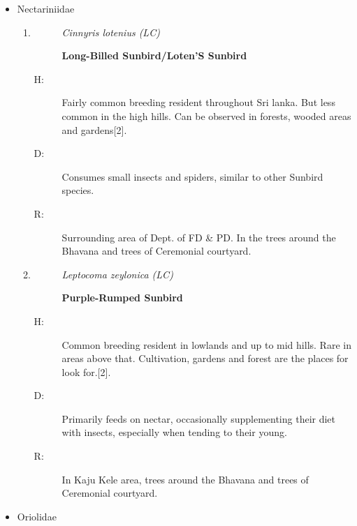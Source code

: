 \begin{itemize}
\begin{enumerate}
\begin{description}
\item[D: ]%
Primary diet comprises insects and other invertebrates. Occasion, they may also consume flower nectar, geckos, leeches and centipedes.%
\item[R: ]%
Around the Faculty of IT, Kaju kele and boat yard.%
\end{description}%
\end{enumerate}%
\item%
Nectariniidae%
\begin{enumerate}%
\item%
\begin{description}%
\item[]%
\textit{Cinnyris lotenius (LC)}%
\item[]%
\textbf{Long{-}Billed Sunbird/Loten'S Sunbird}%
\end{description}%
\begin{description}%
\item[H: ]%
Fairly common breeding resident throughout Sri lanka. But less common in the high hills. Can be observed in forests, wooded areas and gardens{[}2{]}.%
\item[D: ]%
Consumes small insects and spiders, similar to other Sunbird species.%
\item[R: ]%
Surrounding area of Dept. of FD \& PD. In the trees around the Bhavana and trees of Ceremonial courtyard.%
\end{description}%
\item%
\begin{description}%
\item[]%
\textit{Leptocoma zeylonica (LC)}%
\item[]%
\textbf{Purple{-}Rumped Sunbird}%
\end{description}%
\begin{description}%
\item[H: ]%
Common breeding resident in lowlands and up to mid hills. Rare in areas above that. Cultivation, gardens and forest are the places for look for.{[}2{]}.%
\item[D: ]%
Primarily feeds on nectar, occasionally supplementing their diet with insects, especially when tending to their young.%
\item[R: ]%
In Kaju Kele area, trees around the Bhavana and trees of Ceremonial courtyard. %
\end{description}%
\end{enumerate}%
\item%
Oriolidae%
\begin{enumerate}%

\end{enumerate}
\end{itemize}
